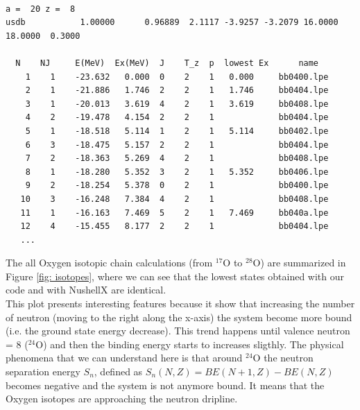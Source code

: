\documentclass[twoside]{article}
\begin{document}
\begin{lstlisting}[label=nushellx, caption= \texttt{o\_20b.lpt} output from NushellX.]

a =  20 z =  8
usdb           1.00000      0.96889  2.1117 -3.9257 -3.2079 16.0000 18.0000  0.3000

  N    NJ     E(MeV)  Ex(MeV)  J    T_z  p  lowest Ex      name
    1    1    -23.632   0.000  0    2    1   0.000     bb0400.lpe          
    2    1    -21.886   1.746  2    2    1   1.746     bb0404.lpe          
    3    1    -20.013   3.619  4    2    1   3.619     bb0408.lpe          
    4    2    -19.478   4.154  2    2    1             bb0404.lpe          
    5    1    -18.518   5.114  1    2    1   5.114     bb0402.lpe          
    6    3    -18.475   5.157  2    2    1             bb0404.lpe          
    7    2    -18.363   5.269  4    2    1             bb0408.lpe          
    8    1    -18.280   5.352  3    2    1   5.352     bb0406.lpe          
    9    2    -18.254   5.378  0    2    1             bb0400.lpe          
   10    3    -16.248   7.384  4    2    1             bb0408.lpe          
   11    1    -16.163   7.469  5    2    1   7.469     bb040a.lpe          
   12    4    -15.455   8.177  2    2    1             bb0404.lpe
   ...
\end{lstlisting}



The all Oxygen isotopic chain calculations (from $^{17}$O to $^{28}$O) are summarized in Figure \ref{fig: isotopes}, where we can see that the lowest states obtained with our code and with NushellX are identical. \\
This plot presents interesting features because it show that increasing the number of neutron (moving to the right along the x-axis) the system become more bound (i.e. the ground state energy decrease). This trend happens until valence neutron = 8 ($^{24}$O) and then the binding energy starts to increases sligthly. The physical phenomena that we can understand here is that around $^{24}$O the neutron separation energy $S_n$, defined as $S_n (N,Z)= BE(N+1,Z)-BE(N,Z)$ becomes negative and the system is not anymore bound. It means that the Oxygen isotopes are approaching the neutron dripline.
 
\end{document}
